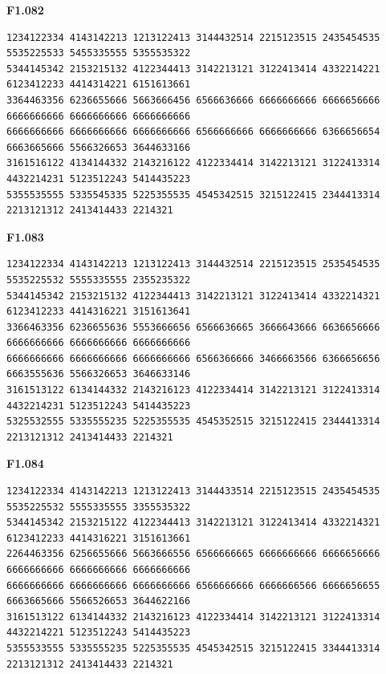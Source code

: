 \noindent\begin{minipage}{\linewidth}\textbf{F1.082}
\begin{lstlisting}
1234122334 4143142213 1213122413 3144432514 2215123515 2435454535 5535225533 5455335555 5355535322
5344145342 2153215132 4122344413 3142213121 3122413414 4332214221 6123412233 4414314221 6151613661
3364463356 6236655666 5663666456 6566636666 6666666666 6666656666 6666666666 6666666666 6666666666
6666666666 6666666666 6666666666 6566666666 6666666666 6366656654 6663665666 5566326653 3644633166
3161516122 4134144332 2143216122 4122334414 3142213121 3122413314 4432214231 5123512243 5414435223
5355535555 5335545335 5225355535 4545342515 3215122415 2344413314 2213121312 2413414433 2214321
\end{lstlisting}
\end{minipage}\par\smallskip

\noindent\begin{minipage}{\linewidth}\textbf{F1.083}
\begin{lstlisting}
1234122334 4143142213 1213122413 3144432514 2215123515 2535454535 5535225532 5555335555 2355235322
5344145342 2153215132 4122344413 3142213121 3122413414 4332214321 6123412233 4414316221 3151613641
3366463356 6236655636 5553666656 6566636665 3666643666 6636656666 6666666666 6666666666 6666666666
6666666666 6666666666 6666666666 6566366666 3466663566 6366656656 6663555636 5566326653 3646633146
3161513122 6134144332 2143216123 4122334414 3142213121 3122413314 4432214231 5123512243 5414435223
5325532555 5335555235 5225355535 4545352515 3215122415 2344413314 2213121312 2413414433 2214321
\end{lstlisting}
\end{minipage}\par\smallskip

\noindent\begin{minipage}{\linewidth}\textbf{F1.084}
\begin{lstlisting}
1234122334 4143142213 1213122413 3144433514 2215123515 2435454535 5535225532 5555335555 3355535322
5344145342 2153215122 4122344413 3142213121 3122413414 4332214321 6123412233 4414316221 3151613661
2264463356 6256655666 5663666556 6566666665 6666666666 6666656666 6666666666 6666666666 6666666666
6666666666 6666666666 6666666666 6566666666 6666666566 6666656655 6663665666 5566526653 3644622166
3161513122 6134144332 2143216123 4122334414 3142213121 3122413314 4432214221 5123512243 5414435223
5355533555 5335555235 5225355535 4545342515 3215122415 3344413314 2213121312 2413414433 2214321
\end{lstlisting}
\end{minipage}\par\smallskip

